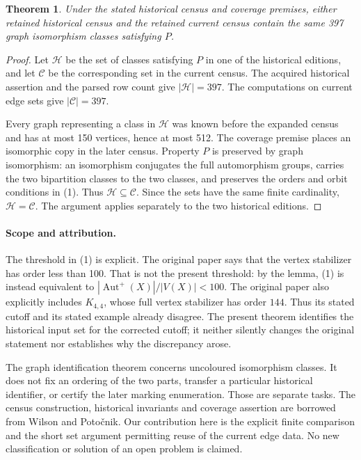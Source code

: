\documentclass[11pt,a4paper]{article}
\newtheorem{theorem}{Theorem}
\begin{document}
\begin{theorem}
Under the stated historical census and coverage premises, either
retained historical census and the retained current census contain
the same 397 graph isomorphism classes satisfying $P$.
\end{theorem}
\begin{proof}
Let $\mathcal H$ be the set of classes satisfying $P$ in one of
the historical editions, and let $\mathcal C$ be the corresponding
set in the current census. The acquired historical assertion and
the parsed row count give $|\mathcal H|=397$. The computations on
current edge sets give $|\mathcal C|=397$.

Every graph representing a class in $\mathcal H$ was known before
the expanded census and has at most 150 vertices, hence at most
512. The coverage premise places an isomorphic copy in the later
census. Property $P$ is preserved by graph isomorphism: an
isomorphism conjugates the full automorphism groups, carries the
two bipartition classes to the two classes, and preserves the
orders and orbit conditions in (1). Thus
$\mathcal H\subseteq\mathcal C$. Since the sets have the same
finite cardinality, $\mathcal H=\mathcal C$. The argument applies
separately to the two historical editions.
\end{proof}

\paragraph{Scope and attribution.}
The threshold in (1) is explicit. The original paper says that the
vertex stabilizer has order less than 100. That is not the present
threshold: by the lemma, (1) is instead equivalent to
$|\operatorname{Aut}^{+}(X)|/|V(X)|<100$. The original paper also
explicitly includes $K_{4,4}$, whose full vertex stabilizer has
order $144$. Thus its stated cutoff and its stated example already
disagree. The present theorem identifies the historical input set
for the corrected cutoff; it neither silently changes the
original statement nor establishes why the discrepancy arose.

The graph identification theorem concerns uncoloured isomorphism
classes. It does not fix an ordering of the two parts, transfer a
particular historical identifier, or certify the later marking
enumeration. Those are separate tasks. The census construction,
historical invariants and coverage assertion are borrowed from
Wilson and Poto\v cnik. Our contribution here is the explicit
finite comparison and the short set argument permitting reuse
of the current edge data. No new classification or solution of
an open problem is claimed.
\end{document}
